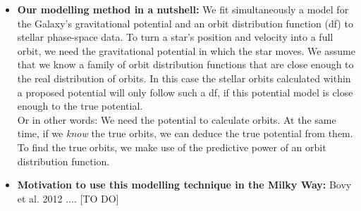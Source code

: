 \documentclass[12pt,preprint]{aastex}
\begin{document}
\begin{itemize}
\item \textbf{Our modelling method in a nutshell:} We fit simultaneously a model for the Galaxy's gravitational potential and an orbit distribution function (df) to stellar phase-space data. To turn a star's position and velocity into a full orbit, we need the gravitational potential in which the star moves. We assume that we know a family of orbit distribution functions that are close enough to the real distribution of orbits. In this case the stellar orbits calculated within a proposed potential will only follow such a df, if this potential model is close enough to the true potential.
\\Or in other words: We need the potential to calculate orbits. At the same time, if we \textit{know} the true orbits, we can deduce the true potential from them. To find the true orbits, we make use of the predictive power of an orbit distribution function.

\item \textbf{Motivation to use this modelling technique in the Milky Way:} Bovy et al. 2012 .... [TO DO]


\end{itemize}
\end{document}

